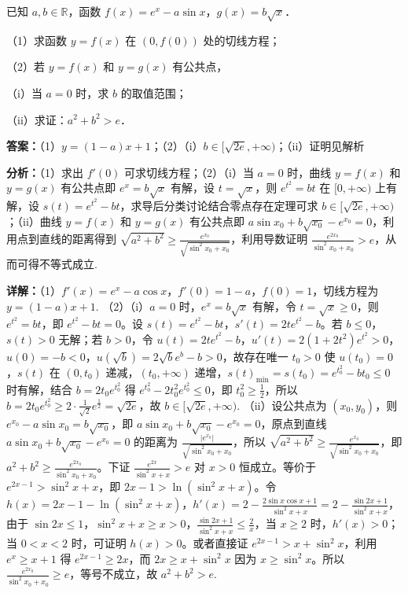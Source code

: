 \begin{question}[points=15]
已知 $a,b\in\mathbb{R}$，函数 $f(x)=e^x-a\sin x$，$g(x)=b\sqrt{x}$．

（1）求函数 $y=f(x)$ 在 $(0,f(0))$ 处的切线方程；

（2）若 $y=f(x)$ 和 $y=g(x)$ 有公共点，

（i）当 $a=0$ 时，求 $b$ 的取值范围；

（ii）求证：$a^2+b^2>e$．
\begin{solution}
\textbf{答案：}（1）$y=(1-a)x+1$；（2）（i）$b\in[\sqrt{2e},+\infty)$；（ii）证明见解析

\textbf{分析：}（1）求出 $f'(0)$ 可求切线方程；（2）（i）当 $a=0$ 时，曲线 $y=f(x)$ 和 $y=g(x)$ 有公共点即 $e^x=b\sqrt{x}$ 有解，设 $t=\sqrt{x}$，则 $e^{t^2}=bt$ 在 $[0,+\infty)$ 上有解，设 $s(t)=e^{t^2}-bt$，求导后分类讨论结合零点存在定理可求 $b\in[\sqrt{2e},+\infty)$；（ii）曲线 $y=f(x)$ 和 $y=g(x)$ 有公共点即 $a\sin x_0+b\sqrt{x_0}-e^{x_0}=0$，利用点到直线的距离得到 $\sqrt{a^2+b^2}\ge\frac{e^{x_0}}{\sqrt{\sin^2 x_0+x_0}}$，利用导数证明 $\frac{e^{2x_0}}{\sin^2 x_0+x_0}>e$，从而可得不等式成立.

\textbf{详解：}（1）$f'(x)=e^x-a\cos x$，$f'(0)=1-a$，$f(0)=1$，切线方程为 $y=(1-a)x+1$.
（2）（i）$a=0$ 时，$e^x=b\sqrt{x}$ 有解，令 $t=\sqrt{x}\ge0$，则 $e^{t^2}=bt$，即 $e^{t^2}-bt=0$。设 $s(t)=e^{t^2}-bt$，$s'(t)=2te^{t^2}-b$。若 $b\le0$，$s(t)>0$ 无解；若 $b>0$，令 $u(t)=2te^{t^2}-b$，$u'(t)=2(1+2t^2)e^{t^2}>0$，$u(0)=-b<0$，$u(\sqrt{b})=2\sqrt{b}e^{b}-b>0$，故存在唯一 $t_0>0$ 使 $u(t_0)=0$，$s(t)$ 在 $(0,t_0)$ 递减，$(t_0,+\infty)$ 递增，$s(t)_{\min}=s(t_0)=e^{t_0^2}-bt_0\le0$ 时有解，结合 $b=2t_0e^{t_0^2}$ 得 $e^{t_0^2}-2t_0^2e^{t_0^2}\le0$，即 $t_0^2\ge\frac{1}{2}$，所以 $b=2t_0e^{t_0^2}\ge2\cdot\frac{1}{\sqrt{2}}e^{\frac{1}{2}}=\sqrt{2e}$，故 $b\in[\sqrt{2e},+\infty)$.
（ii）设公共点为 $(x_0,y_0)$，则 $e^{x_0}-a\sin x_0=b\sqrt{x_0}$，即 $a\sin x_0+b\sqrt{x_0}-e^{x_0}=0$，原点到直线 $a\sin x_0+b\sqrt{x_0}-e^{x_0}=0$ 的距离为 $\frac{|e^{x_0}|}{\sqrt{\sin^2 x_0+x_0}}$，所以 $\sqrt{a^2+b^2}\ge\frac{e^{x_0}}{\sqrt{\sin^2 x_0+x_0}}$，即 $a^2+b^2\ge\frac{e^{2x_0}}{\sin^2 x_0+x_0}$。下证 $\frac{e^{2x}}{\sin^2 x+x}>e$ 对 $x>0$ 恒成立。等价于 $e^{2x-1}>\sin^2 x+x$，即 $2x-1>\ln(\sin^2 x+x)$。令 $h(x)=2x-1-\ln(\sin^2 x+x)$，$h'(x)=2-\frac{2\sin x\cos x+1}{\sin^2 x+x}=2-\frac{\sin2x+1}{\sin^2 x+x}$，由于 $\sin2x\le1$，$\sin^2 x+x\ge x>0$，$\frac{\sin2x+1}{\sin^2 x+x}\le\frac{2}{x}$，当 $x\ge2$ 时，$h'(x)>0$；当 $0<x<2$ 时，可证明 $h(x)>0$。或者直接证 $e^{2x-1}>x+\sin^2 x$，利用 $e^x\ge x+1$ 得 $e^{2x-1}\ge2x$，而 $2x\ge x+\sin^2 x$ 因为 $x\ge\sin^2 x$。所以 $\frac{e^{2x_0}}{\sin^2 x_0+x_0}\ge e$，等号不成立，故 $a^2+b^2>e$.
\end{solution}
\end{question}

